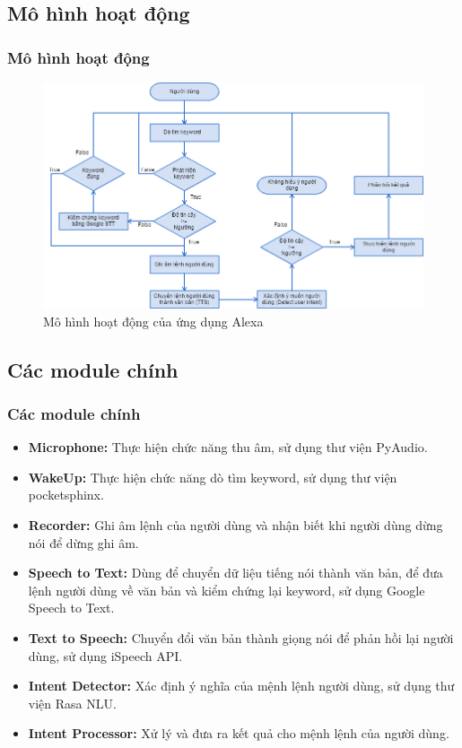 \documentclass{beamer}
\begin{document}
\subsection{Mô hình hoạt động}
\begin{frame}
\frametitle{Mô hình hoạt động}
\begin{figure}
\centering
\includegraphics[scale=0.35]{system_flowchart}
\caption{Mô hình hoạt động của ứng dụng Alexa}
\end{figure}
\end{frame}

\subsection{Các module chính}
\begin{frame}
\frametitle{Các module chính}
\begin{itemize}
    \item \textbf{Microphone:} Thực hiện chức năng thu âm, sử dụng thư viện PyAudio.
    \item \textbf{WakeUp:} Thực hiện chức năng dò tìm keyword, sử dụng thư viện pocketsphinx.
    \item \textbf{Recorder:} Ghi âm lệnh của người dùng và nhận biết khi người dùng dừng nói để dừng ghi âm.
    \item \textbf{Speech to Text:} Dùng để chuyển dữ liệu tiếng nói thành văn bản, để đưa lệnh người dùng về văn bản và kiểm chứng lại keyword, sử dụng Google Speech to Text.
    \item \textbf{Text to Speech:} Chuyển đổi văn bản thành giọng nói để phản hồi lại người dùng, sử dụng iSpeech API.
    \item \textbf{Intent Detector:} Xác định ý nghĩa của mệnh lệnh người dùng, sử dụng thư viện Rasa NLU.
    \item \textbf{Intent Processor:} Xử lý và đưa ra kết quả cho mệnh lệnh của người dùng.
\end{itemize}
\end{frame}
\end{document}
